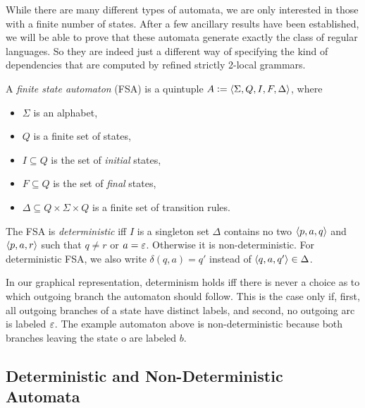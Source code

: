 While there are many different types of automata, we are only interested in those with a finite number of states.
After a few ancillary results have been established, we will be able to prove that these automata generate exactly the class of regular languages.
So they are indeed just a different way of specifying the kind of dependencies that are computed by refined strictly 2-local grammars.
%
\begin{definition}
    A \emph{finite state automaton} (FSA) is a quintuple $A \mathrel{\mathop:}= \left \langle \Sigma, Q, I, F, \Delta \right \rangle $, where
    \begin{itemize}
        \item $\Sigma$ is an alphabet,
        \item $Q$ is a finite set of states,
        \item $I \subseteq Q$ is the set of \emph{initial} states,
        \item $F \subseteq Q$ is the set of \emph{final} states,
        \item $\Delta \subseteq Q \times \Sigma \times Q$ is a finite set of transition rules.
    \end{itemize}
    The FSA is \emph{deterministic} iff $I$ is a singleton set $\Delta$ contains no two $\left \langle p,a,q \right \rangle $ and $\left \langle p,a,r \right \rangle $ such that $q \neq r$ or $a = \varepsilon$.
    Otherwise it is non-deterministic.
    For deterministic FSA, we also write $\delta(q,a) = q'$ instead of $\left \langle q,a,q' \right \rangle  \in \Delta$.
\end{definition}
%
In our graphical representation, determinism holds iff there is never a choice as to which outgoing branch the automaton should follow.
This is the case only if, first, all outgoing branches of a state have distinct labels, and second, no outgoing arc is labeled $\varepsilon$. 
The example automaton above is non-deterministic because both branches leaving the state o are labeled $b$.

\subsection{Deterministic and Non-Deterministic Automata}

